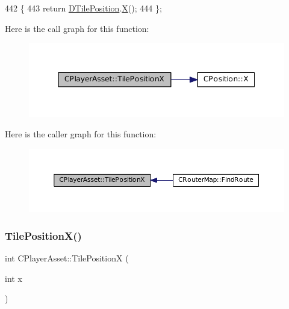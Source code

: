 \begin{DoxyCode}
442                                  \{
443             \textcolor{keywordflow}{return} \hyperlink{classCPlayerAsset_a5b59a9d3b7db8c7fa194b80dafb96186}{DTilePosition}.\hyperlink{classCPosition_a9a6b94d3b91df1492d166d9964c865fc}{X}();  
444         \};
\end{DoxyCode}
Here is the call graph for this function\+:
\nopagebreak
\begin{figure}[H]
\begin{center}
\leavevmode
\includegraphics[width=345pt]{classCPlayerAsset_aeabaa8fe7161cce571b6c4d2f7180085_cgraph}
\end{center}
\end{figure}
Here is the caller graph for this function\+:
\nopagebreak
\begin{figure}[H]
\begin{center}
\leavevmode
\includegraphics[width=350pt]{classCPlayerAsset_aeabaa8fe7161cce571b6c4d2f7180085_icgraph}
\end{center}
\end{figure}
\hypertarget{classCPlayerAsset_ad3a0b4bafbfa9021b59925a5c3364cd5}{}\label{classCPlayerAsset_ad3a0b4bafbfa9021b59925a5c3364cd5} 
\subsubsection{\texorpdfstring{Tile\+Position\+X()}{TilePositionX()}\hspace{0.1cm}{\footnotesize\ttfamily [2/2]}}
{\footnotesize\ttfamily int C\+Player\+Asset\+::\+Tile\+PositionX (\begin{DoxyParamCaption}\item[{int}]{x }\end{DoxyParamCaption})}



